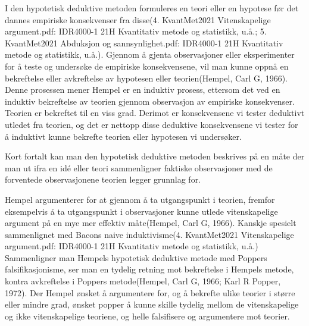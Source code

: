 \documentclass[
]{book}
\begin{document}
I den hypotetisk deduktive metoden formuleres en teori eller en hypotese før det dannes empiriske konsekvenser fra disse(4. KvantMet2021 Vitenskapelige argument.pdf: IDR4000-1 21H Kvantitativ metode og statistikk, u.å.; 5. KvantMet2021 Abduksjon og sannsynlighet.pdf: IDR4000-1 21H Kvantitativ metode og statistikk, u.å.). Gjennom å gjenta observasjoner eller eksperimenter for å teste og undersøke de empiriske konsekvensene, vil man kunne oppnå en bekreftelse eller avkreftelse av hypotesen eller teorien(Hempel, Carl G, 1966). Denne prosessen mener Hempel er en induktiv prosess, ettersom det ved en induktiv bekreftelse av teorien gjennom observasjon av empiriske konsekvenser. Teorien er bekreftet til en viss grad. Derimot er konsekvensene vi tester deduktivt utledet fra teorien, og det er nettopp disse deduktive konsekvensene vi tester for å induktivt kunne bekrefte teorien eller hypotesen vi undersøker.

Kort fortalt kan man den hypotetisk deduktive metoden beskrives på en måte der man ut ifra en idé eller teori sammenligner faktiske observasjoner med de forventede observasjonene teorien legger grunnlag for.

Hempel argumenterer for at gjennom å ta utgangspunkt i teorien, fremfor eksempelvis å ta utgangspunkt i observasjoner kunne utlede vitenskapelige argument på en mye mer effektiv måte(Hempel, Carl G, 1966). Kanskje spesielt sammenlignet med Bacons naive induktivisme(4. KvantMet2021 Vitenskapelige argument.pdf: IDR4000-1 21H Kvantitativ metode og statistikk, u.å.) Sammenligner man Hempels hypotetisk deduktive metode med Poppers falsifikasjonisme, ser man en tydelig retning mot bekreftelse i Hempels metode, kontra avkreftelse i Poppers metode(Hempel, Carl G, 1966; Karl R Popper, 1972). Der Hempel ønsket å argumentere for, og å bekrefte ulike teorier i større eller mindre grad, ønsket popper å kunne skille tydelig mellom de vitenskapelige og ikke vitenskapelige teoriene, og helle falsifisere og argumentere mot teorier.
\end{document}
